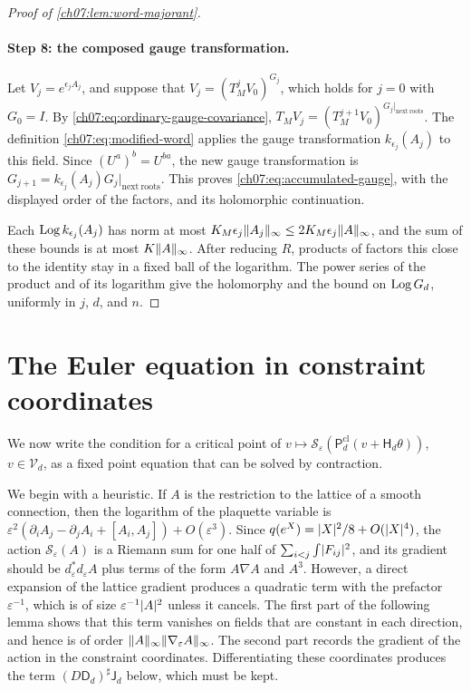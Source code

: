 \begin{proof}[Proof of \cref{ch07:lem:word-majorant}]
\paragraph{Step 8: the composed gauge transformation.}
Let $V_j=e^{\epsilon_jA_j}$, and suppose that $V_j=(T_M^jV_0)^{G_j}$, which holds for $j=0$ with $G_0=I$. By \eqref{ch07:eq:ordinary-gauge-covariance}, $T_MV_j=(T_M^{j+1}V_0)^{G_j|_{\mathrm{next\ roots}}}$. The definition \eqref{ch07:eq:modified-word} applies the gauge transformation $k_{\epsilon_j}(A_j)$ to this field. Since $(U^a)^b=U^{ba}$, the new gauge transformation is $G_{j+1}=k_{\epsilon_j}(A_j)G_j|_{\mathrm{next\ roots}}$. This proves \eqref{ch07:eq:accumulated-gauge}, with the displayed order of the factors, and its holomorphic continuation.

Each $\operatorname{Log} k_{\epsilon_j}(A_j)$ has norm at most $K_M\epsilon_j\lVert A_j\rVert_\infty\le2K_M\epsilon_j\lVert A\rVert_\infty$, and the sum of these bounds is at most $K\lVert A\rVert_\infty$. After reducing $R$, products of factors this close to the identity stay in a fixed ball of the logarithm. The power series of the product and of its logarithm give the holomorphy and the bound on $\operatorname{Log} G_d$, uniformly in $j$, $d$, and $n$.
\end{proof}

\section{The Euler equation in constraint coordinates}\label{ch07:sec:euler}

We now write the condition for a critical point of $v\mapsto\mathscr S_\varepsilon(\mathsf P_d^{\mathrm{cl}}(v+\mathsf H_d\theta))$, $v\in\mathcal V_d$, as a fixed point equation that can be solved by contraction.

We begin with a heuristic. If $A$ is the restriction to the lattice of a smooth connection, then the logarithm of the plaquette variable is $\varepsilon^2(\partial_iA_j-\partial_jA_i+[A_i,A_j])+O(\varepsilon^3)$. Since $q(e^X)=\lvert X\rvert^2/8+O(\lvert X\rvert^4)$, the action $\mathscr S_\varepsilon(A)$ is a Riemann sum for one half of $\sum_{i<j}\int\lvert F_{ij}\rvert^2$, and its gradient should be $d_\varepsilon^*d_\varepsilon A$ plus terms of the form $A\nabla A$ and $A^3$. However, a direct expansion of the lattice gradient produces a quadratic term with the prefactor $\varepsilon^{-1}$, which is of size $\varepsilon^{-1}\lvert A\rvert^2$ unless it cancels. The first part of the following lemma shows that this term vanishes on fields that are constant in each direction, and hence is of order $\lVert A\rVert_\infty\lVert \nabla_\varepsilon A\rVert_\infty$. The second part records the gradient of the action in the constraint coordinates. Differentiating these coordinates produces the term $(D\mathsf D_d)^\sharp\mathsf J_d$ below, which must be kept.

